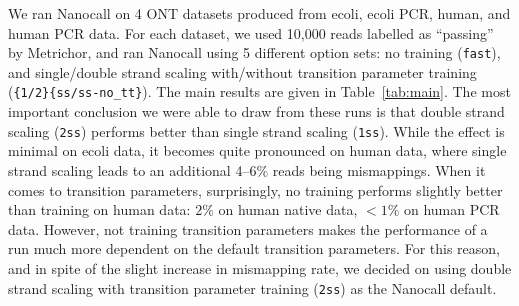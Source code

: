 \documentclass{bioinfo}
\begin{document}
We ran Nanocall on 4 ONT datasets produced from ecoli, ecoli PCR, human, and human PCR data. For each dataset, we used 10,000 reads labelled as ``passing'' by Metrichor, and ran Nanocall using 5 different option sets: no training (\texttt{fast}), and single/double strand scaling with/without transition parameter training (\texttt{\{1/2\}\{ss/ss-no\_tt\}}). The main results are given in Table~\ref{tab:main}. The most important conclusion we were able to draw from these runs is that double strand scaling (\texttt{2ss}) performs better than single strand scaling (\texttt{1ss}). While the effect is minimal on ecoli data, it becomes quite pronounced on human data, where single strand scaling leads to an additional 4--6$\%$ reads being mismappings. When it comes to transition parameters, surprisingly, no training performs slightly better than training on human data: $2\%$ on human native data, $<1\%$ on human PCR data. However, not training transition parameters makes the performance of a run much more dependent on the default transition parameters. For this reason, and in spite of the slight increase in mismapping rate, we decided on using double strand scaling with transition parameter training (\texttt{2ss}) as the Nanocall default.
\end{document}
